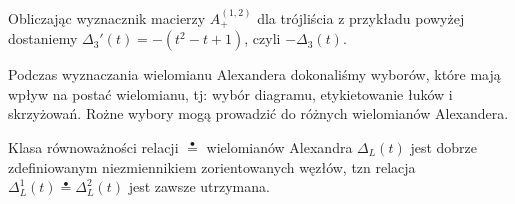 \begin{przyklad}
   Obliczając wyznacznik macierzy $A_+^{(1,2)}$ dla trójliścia z przykładu powyżej dostaniemy $\Delta_3'(t) = -(t^2 - t + 1)$, czyli  $-\Delta_3(t)$.
\end{przyklad}

Podczas wyznaczania wielomianu Alexandera dokonaliśmy wyborów, które mają wpływ na postać wielomianu, tj:
wybór diagramu, etykietowanie łuków i skrzyżowań. Rożne wybory mogą prowadzić do różnych wielomianów Alexandera.

\begin{twierdzenie}
   Klasa równoważności relacji $\stackrel{\bullet}{=}$ wielomianów Alexandra $\Delta_L(t)$ jest dobrze zdefiniowanym
   niezmiennikiem zorientowanych węzłów, tzn relacja $\Delta_L^1(t) \stackrel{\bullet}{=} \Delta_L^2(t)$ jest zawsze utrzymana.
\end{twierdzenie}

